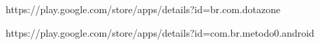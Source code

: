 \documentclass[9pt]{developercv} %
\begin{document}
\newline
\newline
\begin{minipage}[t]{0.3\textwidth}

	\vspace{-\baselineskip} %

	
https://play.google.com/store/apps/details?id=br.com.dotazone
\end{minipage}
\newline
\newline
\begin{minipage}[t]{0.3\textwidth}

	\vspace{-\baselineskip} %

	
https://play.google.com/store/apps/details?id=com.br.metodo0.android
\end{minipage}
\end{document}
